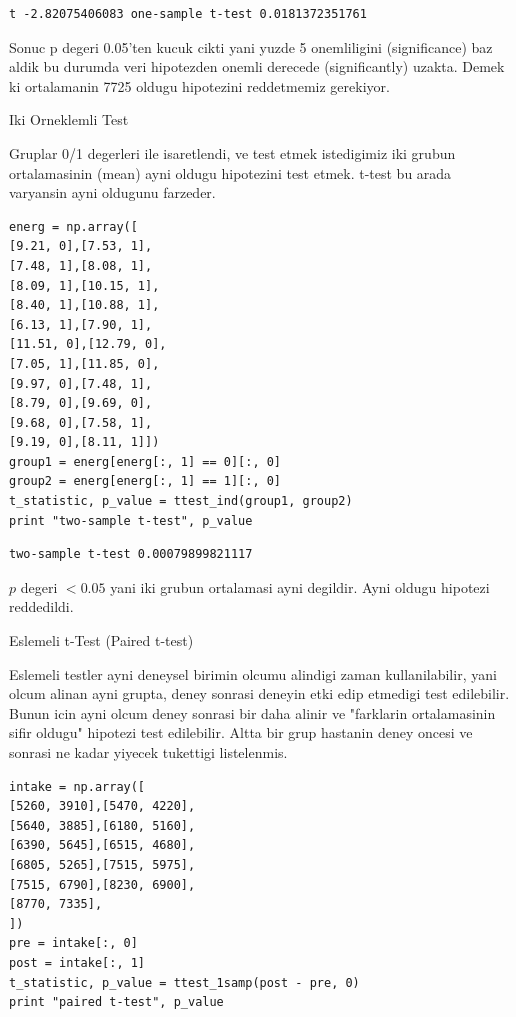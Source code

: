 \documentclass[12pt,fleqn]{article}\usepackage{../common}
\begin{document}
\begin{verbatim}
t -2.82075406083 one-sample t-test 0.0181372351761
\end{verbatim}

Sonuc p degeri 0.05'ten kucuk cikti yani yuzde 5 onemliligini
(significance) baz aldik bu durumda veri hipotezden onemli derecede
(significantly) uzakta. Demek ki ortalamanin 7725 oldugu hipotezini
reddetmemiz gerekiyor.

Iki Orneklemli Test

Gruplar 0/1 degerleri ile isaretlendi, ve test etmek istedigimiz iki grubun
ortalamasinin (mean) ayni oldugu hipotezini test etmek. t-test bu arada
varyansin ayni oldugunu farzeder.

\begin{verbatim}
energ = np.array([
[9.21, 0],[7.53, 1],
[7.48, 1],[8.08, 1],
[8.09, 1],[10.15, 1],
[8.40, 1],[10.88, 1],
[6.13, 1],[7.90, 1],
[11.51, 0],[12.79, 0],
[7.05, 1],[11.85, 0],
[9.97, 0],[7.48, 1],
[8.79, 0],[9.69, 0],
[9.68, 0],[7.58, 1],
[9.19, 0],[8.11, 1]])
group1 = energ[energ[:, 1] == 0][:, 0]
group2 = energ[energ[:, 1] == 1][:, 0]
t_statistic, p_value = ttest_ind(group1, group2)
print "two-sample t-test", p_value
\end{verbatim}

\begin{verbatim}
two-sample t-test 0.00079899821117
\end{verbatim}

$p$ degeri $< 0.05$ yani iki grubun ortalamasi ayni degildir. Ayni oldugu
hipotezi reddedildi.

Eslemeli t-Test (Paired t-test)

Eslemeli testler ayni deneysel birimin olcumu alindigi zaman
kullanilabilir, yani olcum alinan ayni grupta, deney sonrasi deneyin
etki edip etmedigi test edilebilir. Bunun icin ayni olcum deney
sonrasi bir daha alinir ve "farklarin ortalamasinin sifir oldugu"
hipotezi test edilebilir. Altta bir grup hastanin deney oncesi ve
sonrasi ne kadar yiyecek tukettigi listelenmis. 

\begin{verbatim}
intake = np.array([
[5260, 3910],[5470, 4220],
[5640, 3885],[6180, 5160],
[6390, 5645],[6515, 4680],
[6805, 5265],[7515, 5975],
[7515, 6790],[8230, 6900],
[8770, 7335],
])
pre = intake[:, 0]
post = intake[:, 1]
t_statistic, p_value = ttest_1samp(post - pre, 0)
print "paired t-test", p_value
\end{verbatim}
\end{document}
